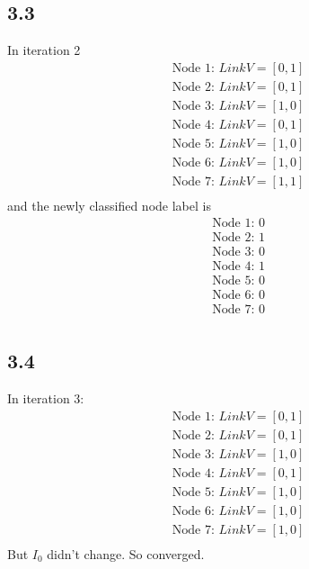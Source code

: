 \documentclass{book}
\begin{document}
\subsection*{3.3}
In iteration 2
    \begin{align*}
        & \textrm{Node 1: } LinkV= [0, 1]\\
        & \textrm{Node 2: } LinkV= [0, 1]\\
        & \textrm{Node 3: } LinkV= [1, 0]\\
        & \textrm{Node 4: } LinkV= [0, 1]\\
        & \textrm{Node 5: } LinkV= [1, 0]\\
        & \textrm{Node 6: } LinkV= [1, 0]\\
        & \textrm{Node 7: } LinkV= [1, 1]\\
    \end{align*}
and the newly classified node label is 
    \begin{align*}
        & \textrm{Node 1: } 0\\
        & \textrm{Node 2: } 1\\
        & \textrm{Node 3: } 0\\
        & \textrm{Node 4: } 1\\
        & \textrm{Node 5: } 0\\
        & \textrm{Node 6: } 0\\
        & \textrm{Node 7: } 0\\
    \end{align*}
    
\subsection*{3.4}
In iteration 3: 
    \begin{align*}
        & \textrm{Node 1: } LinkV= [0, 1]\\
        & \textrm{Node 2: } LinkV= [0, 1]\\
        & \textrm{Node 3: } LinkV= [1, 0]\\
        & \textrm{Node 4: } LinkV= [0, 1]\\
        & \textrm{Node 5: } LinkV= [1, 0]\\
        & \textrm{Node 6: } LinkV= [1, 0]\\
        & \textrm{Node 7: } LinkV= [1, 0]\\
    \end{align*}
But $I_0$ didn't change. So converged. 
\end{document}
